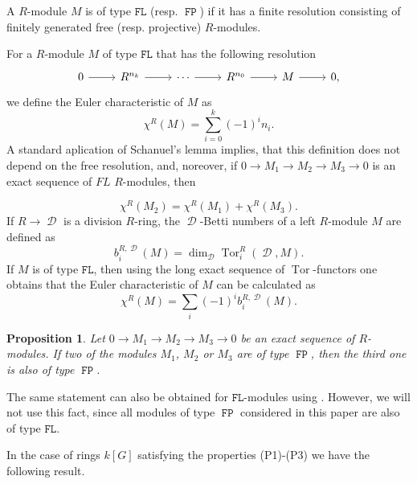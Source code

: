 \documentclass{amsart}
\newtheorem{pro}[lem]{Proposition}
\theoremstyle{definition}
\theoremstyle{remark}
\DeclareMathOperator{\D}{\mathcal D}
\newcommand{\FL}{\mathtt{FL}}
\DeclareMathOperator{\Tor}{Tor}
\DeclareMathOperator{\FP}{\mathtt{FP}}
\begin{document}
A $R$-module $M$ is of type $\FL$  (resp. $\FP$) if it has a finite resolution consisting of finitely generated free (resp. projective) $R$-modules. 


For a $R$-module $M$ of type $\FL$ that has the following  resolution 
\begin{equation*}
     \begin{tikzcd}
         0  \ar[r]&  R^{n_k}  \ar[r] &  \cdots \ar[r] &  R^{n_0} \ar[r] & M  \ar[r] & 0,
\end{tikzcd}
\end{equation*} 
 we define the Euler characteristic of $M$ as  $$\chi^R(M)=\sum_{i=0}^k (-1)^i n_i.$$ A standard aplication of Schanuel’s lemma \cite[Chapter VIII, Lemma 4.4]{Bro82} implies, that this definition does not depend on the free resolution, and, noreover, if $0\to M_1\to M_2\to M_3\to 0$ is an exact sequence of   $FL$ $R$-modules, then 

\begin{equation}
    \label{FL}
    \chi^R(M_2)=\chi^R(M_1)+\chi^R(M_3).
\end{equation}
If $R\to \D$ is a division $R$-ring, the $\D$-Betti numbers of a left $R$-module $M$ are defined as 
\[b^{R,\D}_i(M)=\dim_{\D}  \Tor_i^{R}(\D,M).\]
 If $M$ is of type $\FL$, then using  the long exact sequence of $\Tor$-functors one obtains that the Euler characteristic of $M$ can be calculated as
\begin{equation}
\label{calculatingEuler}
\chi^{R}(M)=\sum_{i} (-1)^i b^{R,\D}_i(M).
\end{equation}

  
 
\begin{pro}\label{FP} \cite[Proposition 1.4 and Proposition 4.1b]{Bie81}
 Let $0\to M_1\to M_2\to M_3\to 0$ be an exact sequence of  $R$-modules. If two of the modules $M_1$, $M_2$ or $M_3$ are of type $\FP$, then  the third one is also of type $\FP$. 
\end{pro}
The same statement can also be obtained for $\FL$-modules using \cite[Theorem~3.9.1]{Bou80}. However, we will not use this fact, since all modules of type $\FP$ considered in this paper are also of type $\FL$.



 
In the case of rings $k[G]$ satisfying the properties (P1)-(P3) we have the following result.
\end{document}
